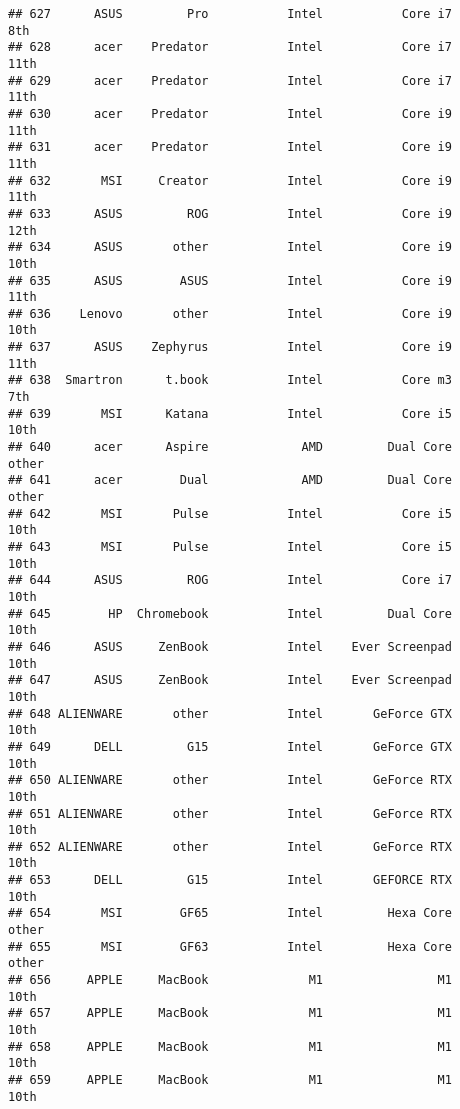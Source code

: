 \documentclass[
]{article}
\begin{document}
\begin{verbatim}
## 627      ASUS         Pro           Intel           Core i7             8th
## 628      acer    Predator           Intel           Core i7            11th
## 629      acer    Predator           Intel           Core i7            11th
## 630      acer    Predator           Intel           Core i9            11th
## 631      acer    Predator           Intel           Core i9            11th
## 632       MSI     Creator           Intel           Core i9            11th
## 633      ASUS         ROG           Intel           Core i9            12th
## 634      ASUS       other           Intel           Core i9            10th
## 635      ASUS        ASUS           Intel           Core i9            11th
## 636    Lenovo       other           Intel           Core i9            10th
## 637      ASUS    Zephyrus           Intel           Core i9            11th
## 638  Smartron      t.book           Intel           Core m3             7th
## 639       MSI      Katana           Intel           Core i5            10th
## 640      acer      Aspire             AMD         Dual Core           other
## 641      acer        Dual             AMD         Dual Core           other
## 642       MSI       Pulse           Intel           Core i5            10th
## 643       MSI       Pulse           Intel           Core i5            10th
## 644      ASUS         ROG           Intel           Core i7            10th
## 645        HP  Chromebook           Intel         Dual Core            10th
## 646      ASUS     ZenBook           Intel    Ever Screenpad            10th
## 647      ASUS     ZenBook           Intel    Ever Screenpad            10th
## 648 ALIENWARE       other           Intel       GeForce GTX            10th
## 649      DELL         G15           Intel       GeForce GTX            10th
## 650 ALIENWARE       other           Intel       GeForce RTX            10th
## 651 ALIENWARE       other           Intel       GeForce RTX            10th
## 652 ALIENWARE       other           Intel       GeForce RTX            10th
## 653      DELL         G15           Intel       GEFORCE RTX            10th
## 654       MSI        GF65           Intel         Hexa Core           other
## 655       MSI        GF63           Intel         Hexa Core           other
## 656     APPLE     MacBook              M1                M1            10th
## 657     APPLE     MacBook              M1                M1            10th
## 658     APPLE     MacBook              M1                M1            10th
## 659     APPLE     MacBook              M1                M1            10th

\end{verbatim}
\end{document}
